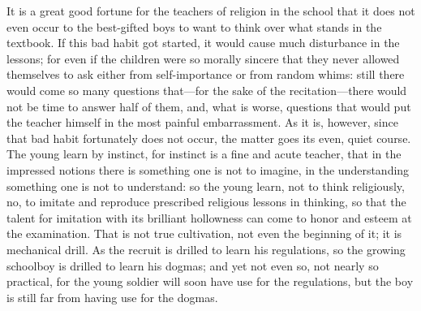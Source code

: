 \documentclass[12pt,a4paper,openany]{book}
\begin{document}
It is a great good fortune for the teachers of religion in the school
that it does not even occur to the best-gifted boys
to want to think over what stands in the textbook.
If this bad habit got started, it would cause much
disturbance in the lessons; for even if the children were
so morally sincere that they never allowed themselves to ask
either from self-importance or from random whims: still
there would come so many questions that---for the sake of
the recitation---there would not be time to answer
half of them, and, what is worse, questions that
would put the teacher himself in the most painful embarrassment.
As it is, however, since that bad habit fortunately does not occur,
the matter goes its even, quiet course. The young learn by
instinct, for instinct is a fine and acute teacher,
that in the impressed notions there is something one is not
to imagine, in the understanding something one is not to understand:
so the young learn, not to think religiously, no, to imitate
and reproduce prescribed religious lessons in thinking, so that
the talent for imitation with its brilliant hollowness can come to
honor and esteem at the examination. That is not true cultivation,
not even the beginning of it; it is mechanical
drill. As the recruit is drilled to learn his regulations,
so the growing schoolboy is drilled
to learn his dogmas; and yet not even so,
not nearly so practical, for the young soldier will soon
have use for the regulations, but the boy is still
far from having use for the dogmas.
\end{document}
